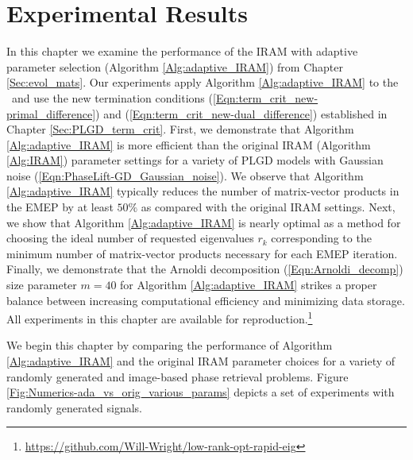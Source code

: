 \chapter{Experimental Results}
\label{Sec:Numerics}


In this chapter we examine the performance of the IRAM with adaptive parameter selection (Algorithm \ref{Alg:adaptive_IRAM}) from Chapter \ref{Sec:evol_mats}.
Our experiments apply Algorithm \ref{Alg:adaptive_IRAM} to the \emep \ and use the new termination conditions (\ref{Eqn:term_crit_new-primal_difference}) and (\ref{Eqn:term_crit_new-dual_difference}) established in Chapter \ref{Sec:PLGD_term_crit}.
First, we demonstrate that Algorithm \ref{Alg:adaptive_IRAM} is more efficient than the original IRAM (Algorithm \ref{Alg:IRAM}) parameter settings for a variety of PLGD models with Gaussian noise (\ref{Eqn:PhaseLift-GD_Gaussian_noise}).
We observe that Algorithm \ref{Alg:adaptive_IRAM} typically reduces the number of matrix-vector products in the EMEP by at least $50\%$ as compared with the original IRAM settings.
Next, we show that Algorithm \ref{Alg:adaptive_IRAM} is nearly optimal as a method for choosing the ideal number of requested eigenvalues $r_k$ corresponding to the minimum number of matrix-vector products necessary for each EMEP iteration.
Finally, we demonstrate that the Arnoldi decomposition (\ref{Eqn:Arnoldi_decomp}) size parameter $m = 40$ for Algorithm \ref{Alg:adaptive_IRAM} strikes a proper balance between increasing computational efficiency and minimizing data storage.
All experiments in this chapter are available for reproduction.\footnote{\url{https://github.com/Will-Wright/low-rank-opt-rapid-eig}}




We begin this chapter by comparing the performance of Algorithm \ref{Alg:adaptive_IRAM} and the original IRAM parameter choices for a variety of randomly generated and image-based phase retrieval problems.
Figure \ref{Fig:Numerics-ada_vs_orig_various_params} depicts a set of experiments with randomly generated signals.


